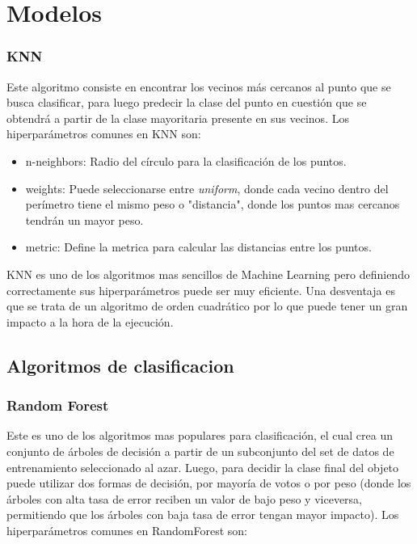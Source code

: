 \documentclass[12pt,a4paper]{article}
\begin{document}
\section{Modelos}
\subsubsection{KNN}
Este algoritmo consiste en encontrar los vecinos más cercanos al punto que se busca clasificar, para luego predecir la clase del punto en cuestión que se obtendrá a partir de la clase mayoritaria presente en sus vecinos.
Los hiperparámetros comunes en KNN son:
\begin{itemize}
    \item n-neighbors: Radio del círculo para la clasificación de los puntos.
    
    \item weights: Puede seleccionarse entre \textit{uniform}, donde cada vecino dentro del perímetro tiene el mismo peso o "distancia", donde los puntos mas cercanos tendrán un mayor peso.
    
    \item metric: Define la metrica para calcular las distancias entre los puntos.
    
\end{itemize}
KNN es uno de los algoritmos mas sencillos de Machine Learning pero definiendo correctamente sus hiperparámetros puede ser muy eficiente. Una desventaja es que se trata de un algoritmo de orden cuadrático por lo que puede tener un gran impacto a la hora de la ejecución.

\subsection{Algoritmos de clasificacion}

\subsubsection{Random Forest}
Este es uno de los algoritmos mas populares para clasificación, el cual crea un conjunto de árboles de decisión a partir de un subconjunto del set de datos de entrenamiento seleccionado al azar. 
Luego, para decidir la clase final del objeto puede utilizar dos formas de decisión, por mayoría de votos o por peso (donde los árboles con alta tasa de error reciben un valor de bajo peso y viceversa, permitiendo que los árboles con baja tasa de error tengan mayor impacto).
Los hiperparámetros comunes en RandomForest son:
\end{document}
